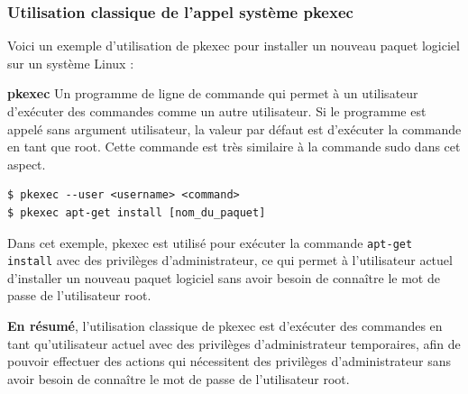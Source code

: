 \documentclass[12pt,a4paper]{article}
\newcommand{\code}[1]{\colorbox{light-gray}{\texttt{#1}}}
\begin{document}
\begin{flushleft}
\begin{flushleft}
                \subsubsection{Utilisation classique de l'appel système pkexec}
                \begin{flushleft}
                    \noindent Voici un exemple d'utilisation de pkexec pour installer un nouveau paquet logiciel sur un système Linux :
                    \item \textbf{pkexec} Un programme de ligne de commande qui permet à un utilisateur d’exécuter des commandes comme un autre utilisateur. Si le programme est appelé sans argument utilisateur, la valeur par défaut est d’exécuter la commande en tant que root. Cette commande est très similaire à la commande sudo dans cet aspect. \cite{CVE2021425:online}
                    \begin{lstlisting}
$ pkexec --user <username> <command>
$ pkexec apt-get install [nom_du_paquet]
                    \end{lstlisting}
                    \item Dans cet exemple, pkexec est utilisé pour exécuter la commande \code{apt-get install} avec des privilèges d'administrateur, ce qui permet à l'utilisateur actuel d'installer un nouveau paquet logiciel sans avoir besoin de connaître le mot de passe de l'utilisateur root.
                    \item \textbf{En résumé}, l'utilisation classique de pkexec est d'exécuter des commandes en tant qu'utilisateur actuel avec des privilèges d'administrateur temporaires, afin de pouvoir effectuer des actions qui nécessitent des privilèges d'administrateur sans avoir besoin de connaître le mot de passe de l'utilisateur root.
                \end{flushleft}

\end{flushleft}
\end{flushleft}
\end{document}

